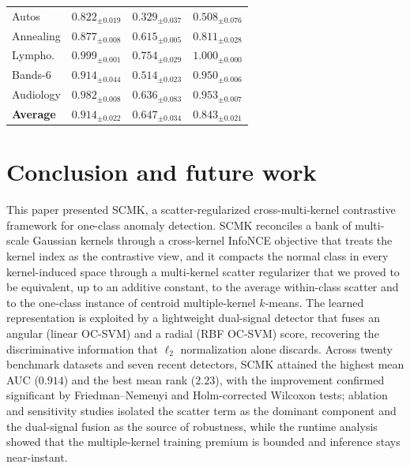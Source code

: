 \documentclass[times, review, 10pt]{elsarticle}
\begin{document}
\begin{table}[t]
\begin{tabular}{lccc}
Autos         & $\mathbf{0.822}_{\pm0.019}$ & $0.329_{\pm0.037}$ & $0.508_{\pm0.076}$ \\
Annealing     & $\mathbf{0.877}_{\pm0.008}$ & $0.615_{\pm0.005}$ & $0.811_{\pm0.028}$ \\
Lympho.       & $0.999_{\pm0.001}$ & $0.754_{\pm0.029}$ & $\mathbf{1.000}_{\pm0.000}$ \\
Bands-6       & $0.914_{\pm0.044}$ & $0.514_{\pm0.023}$ & $\mathbf{0.950}_{\pm0.006}$ \\
Audiology     & $\mathbf{0.982}_{\pm0.008}$ & $0.636_{\pm0.083}$ & $0.953_{\pm0.007}$ \\
\midrule
\textbf{Average} & $\mathbf{0.914}_{\pm0.022}$ & $0.647_{\pm0.034}$ & $0.843_{\pm0.021}$ \\
\bottomrule
\end{tabular}
\end{table}

\section{Conclusion and future work}
\label{sec:conclusion}

This paper presented SCMK, a scatter-regularized cross-multi-kernel contrastive
framework for one-class anomaly detection. SCMK reconciles a bank of multi-scale
Gaussian kernels through a cross-kernel InfoNCE objective that treats the kernel
index as the contrastive view, and it compacts the normal class in every
kernel-induced space through a multi-kernel scatter regularizer that we proved to
be equivalent, up to an additive constant, to the average within-class scatter and
to the one-class instance of centroid multiple-kernel $k$-means. The learned
representation is exploited by a lightweight dual-signal detector that fuses an
angular (linear OC-SVM) and a radial (RBF OC-SVM) score, recovering the
discriminative information that $\ell_2$ normalization alone discards. Across
twenty benchmark datasets and seven recent detectors, SCMK attained the highest
mean AUC ($0.914$) and the best mean rank ($2.23$), with the improvement confirmed
significant by Friedman--Nemenyi and Holm-corrected Wilcoxon tests; ablation and
sensitivity studies isolated the scatter term as the dominant component and the
dual-signal fusion as the source of robustness, while the runtime analysis showed
that the multiple-kernel training premium is bounded and inference stays
near-instant.
\end{document}
